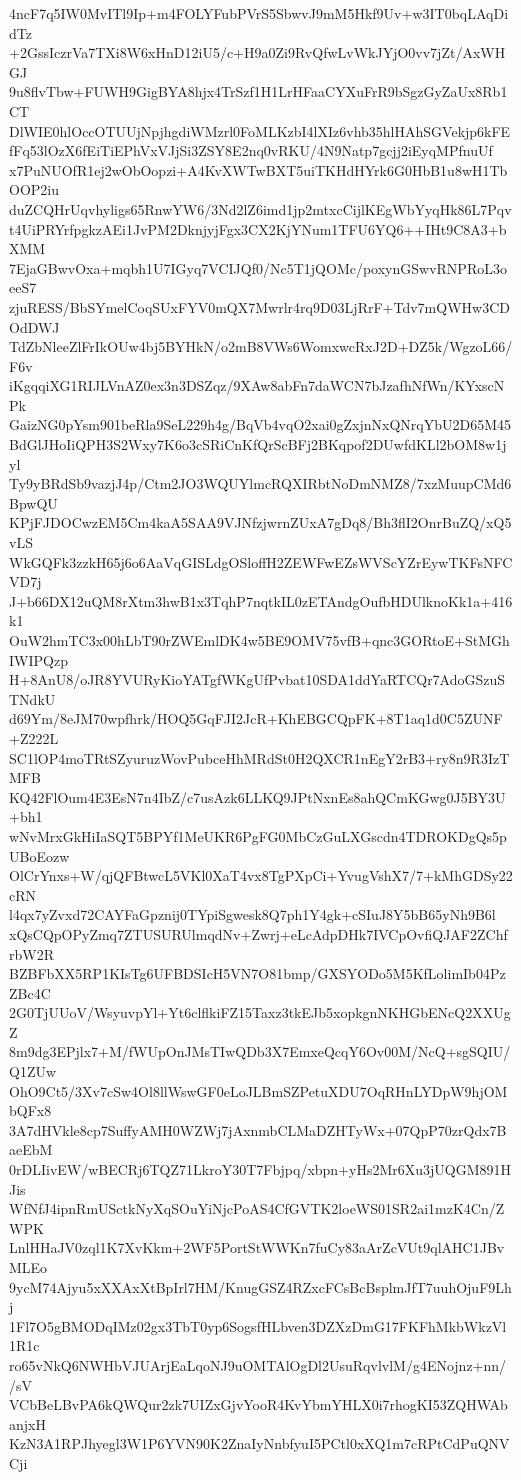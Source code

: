 4ncF7q5IW0MvITl9Ip+m4FOLYFubPVrS5SbwvJ9mM5Hkf9Uv+w3IT0bqLAqDidTz
+2GssIczrVa7TXi8W6xHnD12iU5/c+H9a0Zi9RvQfwLvWkJYjO0vv7jZt/AxWHGJ
9u8flvTbw+FUWH9GigBYA8hjx4TrSzf1H1LrHFaaCYXuFrR9bSgzGyZaUx8Rb1CT
DlWIE0hlOccOTUUjNpjhgdiWMzrl0FoMLKzbI4lXIz6vhb35hlHAhSGVekjp6kFE
fFq53lOzX6fEiTiEPhVxVJjSi3ZSY8E2nq0vRKU/4N9Natp7gcjj2iEyqMPfnuUf
x7PuNUOfR1ej2wObOopzi+A4KvXWTwBXT5uiTKHdHYrk6G0HbB1u8wH1TbOOP2iu
duZCQHrUqvhyligs65RnwYW6/3Nd2lZ6imd1jp2mtxcCijlKEgWbYyqHk86L7Pqv
t4UiPRYrfpgkzAEi1JvPM2DknjyjFgx3CX2KjYNum1TFU6YQ6++IHt9C8A3+bXMM
7EjaGBwvOxa+mqbh1U7IGyq7VCIJQf0/Nc5T1jQOMc/poxynGSwvRNPRoL3oeeS7
zjuRESS/BbSYmelCoqSUxFYV0mQX7Mwrlr4rq9D03LjRrF+Tdv7mQWHw3CDOdDWJ
TdZbNleeZlFrIkOUw4bj5BYHkN/o2mB8VWs6WomxwcRxJ2D+DZ5k/WgzoL66/F6v
iKgqqiXG1RIJLVnAZ0ex3n3DSZqz/9XAw8abFn7daWCN7bJzafhNfWn/KYxscNPk
GaizNG0pYsm901beRla9SeL229h4g/BqVb4vqO2xai0gZxjnNxQNrqYbU2D65M45
BdGlJHoIiQPH3S2Wxy7K6o3cSRiCnKfQrScBFj2BKqpof2DUwfdKLl2bOM8w1jyl
Ty9yBRdSb9vazjJ4p/Ctm2JO3WQUYlmcRQXIRbtNoDmNMZ8/7xzMuupCMd6BpwQU
KPjFJDOCwzEM5Cm4kaA5SAA9VJNfzjwrnZUxA7gDq8/Bh3flI2OnrBuZQ/xQ5vLS
WkGQFk3zzkH65j6o6AaVqGISLdgOSloffH2ZEWFwEZsWVScYZrEywTKFsNFCVD7j
J+b66DX12uQM8rXtm3hwB1x3TqhP7nqtkIL0zETAndgOufbHDUlknoKk1a+416k1
OuW2hmTC3x00hLbT90rZWEmlDK4w5BE9OMV75vfB+qnc3GORtoE+StMGhIWIPQzp
H+8AnU8/oJR8YVURyKioYATgfWKgUfPvbat10SDA1ddYaRTCQr7AdoGSzuSTNdkU
d69Ym/8eJM70wpfhrk/HOQ5GqFJI2JcR+KhEBGCQpFK+8T1aq1d0C5ZUNF+Z222L
SC1lOP4moTRtSZyuruzWovPubceHhMRdSt0H2QXCR1nEgY2rB3+ry8n9R3IzTMFB
KQ42FlOum4E3EsN7n4IbZ/c7usAzk6LLKQ9JPtNxnEs8ahQCmKGwg0J5BY3U+bh1
wNvMrxGkHiIaSQT5BPYf1MeUKR6PgFG0MbCzGuLXGscdn4TDROKDgQs5pUBoEozw
OlCrYnxs+W/qjQFBtwcL5VKl0XaT4vx8TgPXpCi+YvugVshX7/7+kMhGDSy22cRN
l4qx7yZvxd72CAYFaGpznij0TYpiSgwesk8Q7ph1Y4gk+cSIuJ8Y5bB65yNh9B6l
xQsCQpOPyZmq7ZTUSURUlmqdNv+Zwrj+eLcAdpDHk7IVCpOvfiQJAF2ZChfrbW2R
BZBFbXX5RP1KIsTg6UFBDSIcH5VN7O81bmp/GXSYODo5M5KfLolimIb04PzZBc4C
2G0TjUUoV/WsyuvpYl+Yt6clflkiFZ15Taxz3tkEJb5xopkgnNKHGbENcQ2XXUgZ
8m9dg3EPjlx7+M/fWUpOnJMsTIwQDb3X7EmxeQcqY6Ov00M/NcQ+sgSQIU/Q1ZUw
OhO9Ct5/3Xv7cSw4Ol8llWswGF0eLoJLBmSZPetuXDU7OqRHnLYDpW9hjOMbQFx8
3A7dHVkle8cp7SuffyAMH0WZWj7jAxnmbCLMaDZHTyWx+07QpP70zrQdx7BaeEbM
0rDLIivEW/wBECRj6TQZ71LkroY30T7Fbjpq/xbpn+yHs2Mr6Xu3jUQGM891HJis
WfNfJ4ipnRmUSctkNyXqSOuYiNjcPoAS4CfGVTK2loeWS01SR2ai1mzK4Cn/ZWPK
LnlHHaJV0zql1K7XvKkm+2WF5PortStWWKn7fuCy83aArZcVUt9qlAHC1JBvMLEo
9ycM74Ajyu5xXXAxXtBpIrl7HM/KnugGSZ4RZxcFCsBcBsplmJfT7uuhOjuF9Lhj
1Fl7O5gBMODqIMz02gx3TbT0yp6SogsfHLbven3DZXzDmG17FKFhMkbWkzVl1R1c
ro65vNkQ6NWHbVJUArjEaLqoNJ9uOMTAlOgDl2UsuRqvlvlM/g4ENojnz+nn//sV
VCbBeLBvPA6kQWQur2zk7UIZxGjvYooR4KvYbmYHLX0i7rhogKI53ZQHWAbanjxH
KzN3A1RPJhyegl3W1P6YVN90K2ZnaIyNnbfyuI5PCtl0xXQ1m7cRPtCdPuQNVCji
